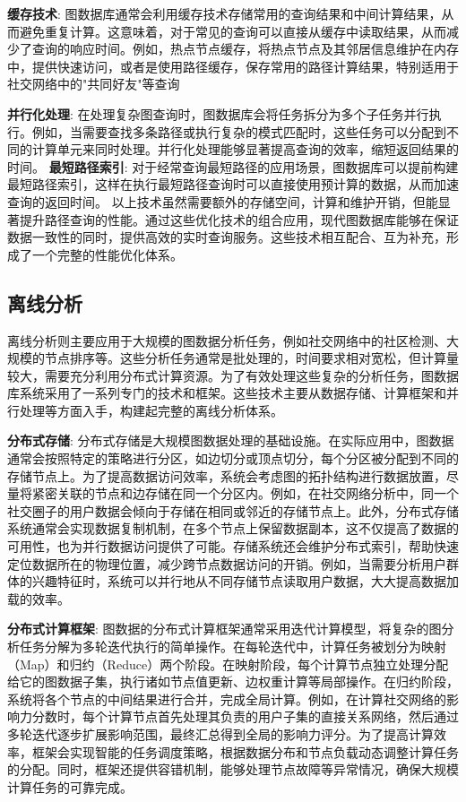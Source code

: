 \textbf{缓存技术}: 图数据库通常会利用缓存技术存储常用的查询结果和中间计算结果，从而避免重复计算。这意味着，对于常见的查询可以直接从缓存中读取结果，从而减少了查询的响应时间。例如，热点节点缓存，将热点节点及其邻居信息维护在内存中，提供快速访问，或者是使用路径缓存，保存常用的路径计算结果，特别适用于社交网络中的"共同好友"等查询


\textbf{并行化处理}: 在处理复杂图查询时，图数据库会将任务拆分为多个子任务并行执行。例如，当需要查找多条路径或执行复杂的模式匹配时，这些任务可以分配到不同的计算单元来同时处理。并行化处理能够显著提高查询的效率，缩短返回结果的时间。
\textbf{最短路径索引}: 对于经常查询最短路径的应用场景，图数据库可以提前构建最短路径索引，这样在执行最短路径查询时可以直接使用预计算的数据，从而加速查询的返回时间。
以上技术虽然需要额外的存储空间，计算和维护开销，但能显著提升路径查询的性能。通过这些优化技术的组合应用，现代图数据库能够在保证数据一致性的同时，提供高效的实时查询服务。这些技术相互配合、互为补充，形成了一个完整的性能优化体系。

\vspace{1cm}
\subsection{离线分析}

离线分析则主要应用于大规模的图数据分析任务，例如社交网络中的社区检测、大规模的节点排序等。这些分析任务通常是批处理的，时间要求相对宽松，但计算量较大，需要充分利用分布式计算资源。为了有效处理这些复杂的分析任务，图数据库系统采用了一系列专门的技术和框架。这些技术主要从数据存储、计算框架和并行处理等方面入手，构建起完整的离线分析体系。

\textbf{分布式存储}: 分布式存储是大规模图数据处理的基础设施。在实际应用中，图数据通常会按照特定的策略进行分区，如边切分或顶点切分，每个分区被分配到不同的存储节点上。为了提高数据访问效率，系统会考虑图的拓扑结构进行数据放置，尽量将紧密关联的节点和边存储在同一个分区内。例如，在社交网络分析中，同一个社交圈子的用户数据会倾向于存储在相同或邻近的存储节点上。此外，分布式存储系统通常会实现数据复制机制，在多个节点上保留数据副本，这不仅提高了数据的可用性，也为并行数据访问提供了可能。存储系统还会维护分布式索引，帮助快速定位数据所在的物理位置，减少跨节点数据访问的开销。例如，当需要分析用户群体的兴趣特征时，系统可以并行地从不同存储节点读取用户数据，大大提高数据加载的效率。

\textbf{分布式计算框架}: 图数据的分布式计算框架通常采用迭代计算模型，将复杂的图分析任务分解为多轮迭代执行的简单操作。在每轮迭代中，计算任务被划分为映射（Map）和归约（Reduce）两个阶段。在映射阶段，每个计算节点独立处理分配给它的图数据子集，执行诸如节点值更新、边权重计算等局部操作。在归约阶段，系统将各个节点的中间结果进行合并，完成全局计算。例如，在计算社交网络的影响力分数时，每个计算节点首先处理其负责的用户子集的直接关系网络，然后通过多轮迭代逐步扩展影响范围，最终汇总得到全局的影响力评分。为了提高计算效率，框架会实现智能的任务调度策略，根据数据分布和节点负载动态调整计算任务的分配。同时，框架还提供容错机制，能够处理节点故障等异常情况，确保大规模计算任务的可靠完成。

